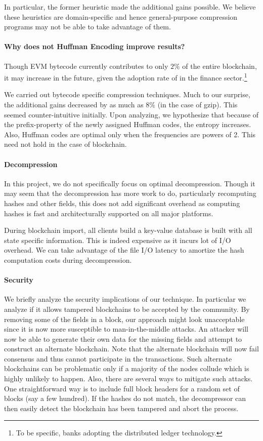 In particular, the former heuristic made the additional gains possible. 
We believe these heuristics are domain-specific and hence general-purpose
compression programs may not be able to take advantage of them.

\paragraph{Why does not Huffman Encoding improve results?}
Though EVM bytecode currently contributes to only $2\%$ of the entire blockchain, it may increase in the future, given the adoption rate of \eth{}  in the finance sector.\footnote{To be specific, banks adopting the distributed ledger technology.} 

We carried out bytecode specific compression techniques. Much to our surprise, the additional gains decreased by as much as $8\%$ (in the case of gzip).
This seemed counter-intuitive initially. Upon analyzing, we hypothesize that
because of the prefix-property of the newly assigned Huffman codes, the entropy increases.
Also, Huffman codes are optimal only when the frequencies are powers of 2. This need not hold in the case of blockchain.


\paragraph{Decompression}
In this project, we do not specifically focus on optimal decompression. 
Though it may seem that the decompression has more work to do, particularly recomputing hashes and other fields, this does not add significant overhead as computing hashes is fast and architecturally supported on all major platforms.

During blockchain import, all \eth{} clients build a key-value database is built with all state specific information. This is indeed expensive as it incurs lot of I/O overhead.
We can take advantage of the file I/O latency to amortize the hash computation costs during decompression.



\paragraph{Security}

We briefly analyze the security implications of our technique. 
In particular we analyze if it allows tampered blockchains to be accepted
by the community.
By removing some of the fields in a block,
our approach might look unacceptable since
it is now more susceptible to man-in-the-middle attacks. 
An attacker will now be able to generate their own data for the missing fields and attempt to construct an alternate blockchain.
Note that the alternate blockchain will now fail consensus and
thus cannot participate in the \eth{} transactions. 
Such alternate blockchains can be problematic 
only if a majority of the nodes collude which is highly unlikely to happen. 
Also, there are several ways to mitigate such attacks.
One straightforward way is to include full block headers for a random set of blocks (say a few hundred). 
If the hashes do not match,
the decompressor can then easily detect  the blockchain has been
tampered and abort the process.
